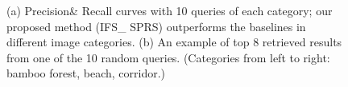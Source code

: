 \documentclass[letterpaper]{article}
\begin{document}
\begin{figure}[!ht]
\label{fig:10retrieval}
\centering
{}


\label{The-result-of-the-retrieval}
\caption{(a) Precision\& Recall curves with 10 queries of each category; our proposed method (IFS\_ SPRS) outperforms the baselines in different image categories. (b) An example of top 8 retrieved results from one of the 10 random queries. (Categories from left to right: bamboo forest, beach, corridor.)}
\end{figure}
\end{document}
